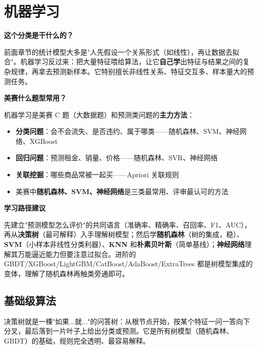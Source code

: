 \chapter{机器学习}

\begin{chapteroverview}
\textbf{这个分类是干什么的？}

前面章节的统计模型大多是"人先假设一个关系形式（如线性），再让数据去拟合"。机器学习反过来：把大量特征喂给算法，让它\textbf{自己学}出特征与结果之间的复杂规律，再拿去预测新样本。它特别擅长非线性关系、特征交互多、样本量大的预测任务。

\textbf{美赛什么题型常用？}

机器学习是美赛 C 题（大数据题）和预测类问题的\textbf{主力方法}：
\begin{itemize}
    \item \textbf{分类问题}：会不会流失、是否违约、属于哪类——随机森林、SVM、神经网络、XGBoost
    \item \textbf{回归问题}：预测租金、销量、价格——随机森林、SVR、神经网络
    \item \textbf{关联挖掘}：哪些商品常被一起买——Apriori 关联规则
    \item 美赛中\textbf{随机森林、SVM、神经网络}是三类最常用、评审最认可的方法
\end{itemize}

\textbf{学习路径建议}

先建立"预测模型怎么评价"的共同语言（准确率、精确率、召回率、F1、AUC），再从\textbf{决策树}（最可解释）入手理解树模型；然后学\textbf{随机森林}（树的集成，稳）、\textbf{SVM}（小样本非线性分类利器）、\textbf{KNN} 和\textbf{朴素贝叶斯}（简单基线）；\textbf{神经网络}理解其万能逼近能力但要注意过拟合。进阶的 GBDT/XGBoost/LightGBM/CatBoost/AdaBoost/ExtraTrees 都是树模型集成的变体，理解了随机森林再触类旁通即可。
\end{chapteroverview}

\section{基础级算法}


\begin{algointro}
决策树就是一棵"如果...就..."的问答树：从根节点开始，按某个特征一问一答向下分叉，最后落到一片叶子上给出分类或预测。它是所有树模型（随机森林、GBDT）的基础，规则完全透明、最容易解释。
\end{algointro}

